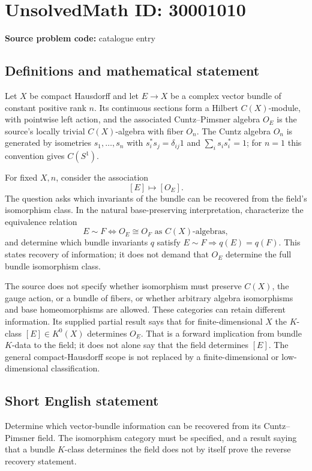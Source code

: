 \documentclass[11pt]{article}
\begin{document}
\section*{UnsolvedMath ID: 30001010}
\textbf{Source problem code:} catalogue entry
\subsection{Definitions and mathematical statement}
Let $X$ be compact Hausdorff and let $E\to X$ be a complex vector bundle of constant positive rank $n$. Its continuous sections form a Hilbert $C(X)$-module, with pointwise left action, and the associated Cuntz--Pimsner algebra $O_E$ is the source's locally trivial $C(X)$-algebra with fiber $O_n$. The Cuntz algebra $O_n$ is generated by isometries $s_1,\ldots,s_n$ with $s_i^*s_j=\delta_{ij}1$ and $\sum_i s_is_i^*=1$; for $n=1$ this convention gives $C(S^1)$.

For fixed $X,n$, consider the association
\[
[E]\longmapsto[O_E].
\]
The question asks which invariants of the bundle can be recovered from the field's isomorphism class. In the natural base-preserving interpretation, characterize the equivalence relation
\[
E\sim F\iff O_E\cong O_F\text{ as }C(X)\text{-algebras},
\]
and determine which bundle invariants $q$ satisfy $E\sim F\Rightarrow q(E)=q(F)$. This states recovery of information; it does not demand that $O_E$ determine the full bundle isomorphism class.

The source does not specify whether isomorphism must preserve $C(X)$, the gauge action, or a bundle of fibers, or whether arbitrary algebra isomorphisms and base homeomorphisms are allowed. These categories can retain different information. Its supplied partial result says that for finite-dimensional $X$ the $K$-class $[E]\in K^0(X)$ determines $O_E$. That is a forward implication from bundle $K$-data to the field; it does not alone say that the field determines $[E]$. The general compact-Hausdorff scope is not replaced by a finite-dimensional or low-dimensional classification.
\subsection{Short English statement}
Determine which vector-bundle information can be recovered from its Cuntz--Pimsner field. The isomorphism category must be specified, and a result saying that a bundle $K$-class determines the field does not by itself prove the reverse recovery statement.
\end{document}
